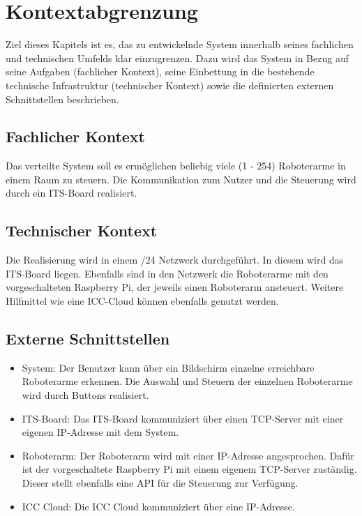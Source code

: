 \chapter{Kontextabgrenzung}
Ziel dieses Kapitels ist es, das zu entwickelnde System innerhalb seines fachlichen und technischen Umfelds klar einzugrenzen. Dazu wird das System in Bezug auf seine Aufgaben (fachlicher Kontext), seine Einbettung in die bestehende technische Infrastruktur (technischer Kontext) sowie die definierten externen Schnittstellen beschrieben.

\section{Fachlicher Kontext}

Das verteilte System soll es ermöglichen beliebig viele (1 - 254) Roboterarme in einem Raum zu steuern. Die Kommunikation zum Nutzer und die Steuerung wird durch ein ITS-Board realisiert. 

\section{Technischer Kontext}

Die Realisierung wird in einem /24 Netzwerk durchgeführt. In diesem wird das ITS-Board liegen. Ebenfalls sind in den Netzwerk die Roboterarme mit den vorgeschalteten Raspberry Pi, der jeweils einen Roboterarm ansteuert. Weitere Hilfmittel wie eine ICC-Cloud können ebenfalls genutzt werden.

\section{Externe Schnittstellen}

\begin{itemize}
	\item{System:} Der Benutzer kann über ein Bildschirm einzelne erreichbare Roboterarme erkennen. Die Auswahl und Steuern der einzelnen Roboterarme wird durch Buttons realisiert.
	
	\item{ITS-Board:} Das ITS-Board kommuniziert über einen TCP-Server mit einer eigenen IP-Adresse mit dem System.
	
	\item{Roboterarm:} Der Roboterarm wird mit einer IP-Adresse angesprochen. Dafür ist der vorgeschaltete Raspberry Pi mit einem eigenem TCP-Server zuständig. Dieser stellt ebenfalls eine API für die Steuerung zur Verfügung.  
	
	\item{ICC Cloud:} Die ICC Cloud kommuniziert über eine IP-Adresse. %
	
	
\end{itemize}